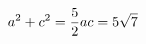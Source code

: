 \documentclass[preview]{standalone}
\begin{document}
\begin{align*}
\special{dvisvgm:raw <g id='unique000'>}a^2+c^2=\frac{5}{2}ac=5\sqrt{7}\special{dvisvgm:raw </g>}
\end{align*}
\end{document}
